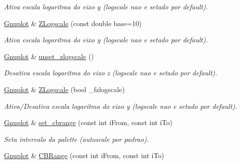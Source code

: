 \begin{DoxyCompactItemize}
\begin{DoxyCompactList}\small\item\em Ativa escala logaritma do eixo y (logscale nao e setado por default). \end{DoxyCompactList}\item 
\hypertarget{classGnuplot_a4a875f9e3f43e22d30be8e52c33df620}{\hyperlink{classGnuplot}{Gnuplot} \& \hyperlink{classGnuplot_a4a875f9e3f43e22d30be8e52c33df620}{Z\-Logscale} (const double base=10)}\label{classGnuplot_a4a875f9e3f43e22d30be8e52c33df620}

\begin{DoxyCompactList}\small\item\em Ativa escala logaritma do eixo y (logscale nao e setado por default). \end{DoxyCompactList}\item 
\hypertarget{classGnuplot_a294d7473091f849fe70e4dba8df8712a}{\hyperlink{classGnuplot}{Gnuplot} \& \hyperlink{classGnuplot_a294d7473091f849fe70e4dba8df8712a}{unset\-\_\-zlogscale} ()}\label{classGnuplot_a294d7473091f849fe70e4dba8df8712a}

\begin{DoxyCompactList}\small\item\em Desativa escala logaritma do eixo z (logscale nao e setado por default). \end{DoxyCompactList}\item 
\hypertarget{classGnuplot_af0157431e784eead31de6eb4e3e5d095}{\hyperlink{classGnuplot}{Gnuplot} \& \hyperlink{classGnuplot_af0157431e784eead31de6eb4e3e5d095}{Z\-Logscale} (bool \-\_\-fzlogscale)}\label{classGnuplot_af0157431e784eead31de6eb4e3e5d095}

\begin{DoxyCompactList}\small\item\em Ativa/\-Desativa escala logaritma do eixo y (logscale nao e setado por default). \end{DoxyCompactList}\item 
\hypertarget{classGnuplot_a2c8c8ae0441f54dd728bc6594051c137}{\hyperlink{classGnuplot}{Gnuplot} \& \hyperlink{classGnuplot_a2c8c8ae0441f54dd728bc6594051c137}{set\-\_\-cbrange} (const int i\-From, const int i\-To)}\label{classGnuplot_a2c8c8ae0441f54dd728bc6594051c137}

\begin{DoxyCompactList}\small\item\em Seta intervalo da palette (autoscale por padrao). \end{DoxyCompactList}\item 
\hypertarget{classGnuplot_ab5b863b17dcc767214e472330bceedca}{\hyperlink{classGnuplot}{Gnuplot} \& \hyperlink{classGnuplot_ab5b863b17dcc767214e472330bceedca}{C\-B\-Range} (const int i\-From, const int i\-To)}\label{classGnuplot_ab5b863b17dcc767214e472330bceedca}


\end{DoxyCompactItemize}
